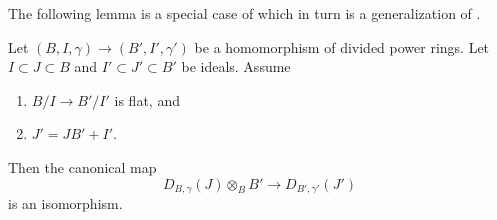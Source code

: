 \noindent
The following lemma is a special case of
\cite[Proposition 2.1.7]{dJ-crystalline} which in turn is a
generalization of \cite[Proposition 2.8.2]{Berthelot}.

\begin{lemma}
\label{lemma-flat-extension-divided-power-envelope}
Let $(B, I, \gamma) \to (B', I', \gamma')$ be a homomorphism of
divided power rings. Let $I \subset J \subset B$ and
$I' \subset J' \subset B'$ be ideals. Assume
\begin{enumerate}
\item $B/I \to B'/I'$ is flat, and
\item $J' = JB' + I'$.
\end{enumerate}
Then the canonical map
$$
D_{B, \gamma}(J) \otimes_B B' \longrightarrow D_{B', \gamma'}(J')
$$
is an isomorphism.
\end{lemma}

